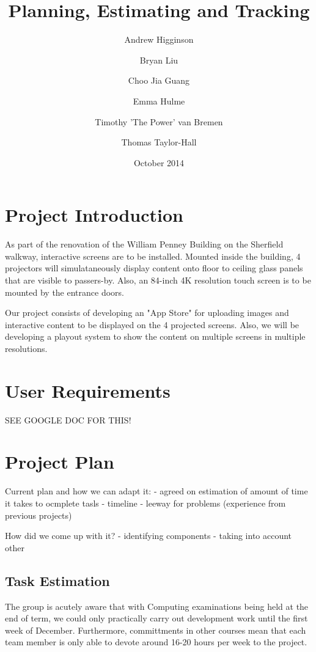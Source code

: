 \documentclass[a4paper]{article}
\begin{document}
\title{Planning, Estimating and Tracking}
\author{Andrew Higginson \and Bryan Liu \and Choo Jia Guang \and Emma Hulme \and Timothy 'The Power' van Bremen \and Thomas Taylor-Hall}
\date{October 2014}
\maketitle

\linespread{1.1}

\section{Project Introduction}
As part of the renovation of the William Penney Building on the Sherfield 
walkway, interactive screens are to be installed. Mounted inside the building, 4
projectors will simulataneously display content onto floor to ceiling glass
panels that are visible to passers-by. Also, an 84-inch 4K resolution touch 
screen is to be mounted by the entrance doors. 

Our project consists of developing an "App Store" for uploading images and 
interactive content to be displayed on the 4 projected screens. Also, we will be
developing a playout system to show the content on multiple screens in multiple 
resolutions.

\section{User Requirements} \label{section:req}

SEE GOOGLE DOC FOR THIS!


\section{Project Plan}
Current plan and how we can adapt it:
	- agreed on estimation of amount of time it takes to ocmplete tasls
  - timeline
  - leeway for problems (experience from previous projects)

How did we come up with it? 
	- identifying components
	- taking into account other 

\subsection{Task Estimation}
The group is acutely aware that with Computing examinations being held at the
end of term, we could only practically carry out development work until the
first week of December. Furthermore, committments in other courses mean that 
each team member is only able to devote around 16-20 hours per week to
the project.
\end{document}
